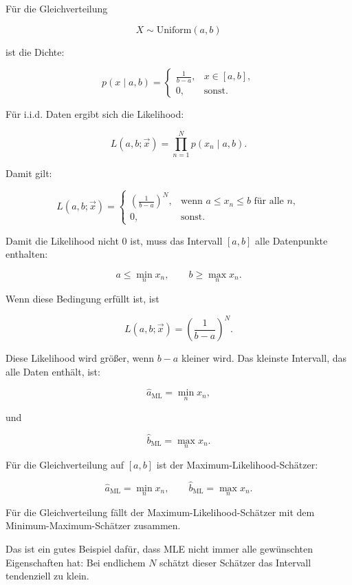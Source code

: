 Für die Gleichverteilung

\[
    X \sim \mathrm{Uniform}(a,b)
\]

ist die Dichte:

\[
    p(x \mid a,b)
    =
    \begin{cases}
        \frac{1}{b-a}, & x \in [a,b], \\
        0, & \text{sonst}.
    \end{cases}
\]

Für i.i.d. Daten ergibt sich die Likelihood:

\[
    L(a,b;\vec{x})
    =
    \prod_{n=1}^{N}
    p(x_n \mid a,b).
\]

Damit gilt:

\[
    L(a,b;\vec{x})
    =
    \begin{cases}
        \left(\frac{1}{b-a}\right)^N,
        & \text{wenn } a \leq x_n \leq b \text{ für alle } n, \\
        0,
        & \text{sonst}.
    \end{cases}
\]

Damit die Likelihood nicht \(0\) ist, muss das Intervall \([a,b]\) alle Datenpunkte enthalten:

\[
    a \leq \min_n x_n,
    \qquad
    b \geq \max_n x_n.
\]

Wenn diese Bedingung erfüllt ist, ist

\[
    L(a,b;\vec{x})
    =
    \left(\frac{1}{b-a}\right)^N.
\]

Diese Likelihood wird größer, wenn \(b-a\) kleiner wird.
Das kleinste Intervall, das alle Daten enthält, ist:

\[
    \hat{a}_{\mathrm{ML}}
    =
    \min_n x_n,
\]

und

\[
    \hat{b}_{\mathrm{ML}}
    =
    \max_n x_n.
\]

\begin{definitionbox}
Für die Gleichverteilung auf \([a,b]\) ist der Maximum-Likelihood-Schätzer:

\[
    \hat{a}_{\mathrm{ML}}
    =
    \min_n x_n,
    \qquad
    \hat{b}_{\mathrm{ML}}
    =
    \max_n x_n.
\]
\end{definitionbox}

\begin{notebox}
Für die Gleichverteilung fällt der Maximum-Likelihood-Schätzer mit dem Minimum-Maximum-Schätzer zusammen.

Das ist ein gutes Beispiel dafür, dass MLE nicht immer alle gewünschten Eigenschaften hat:
Bei endlichem \(N\) schätzt dieser Schätzer das Intervall tendenziell zu klein.
\end{notebox}


